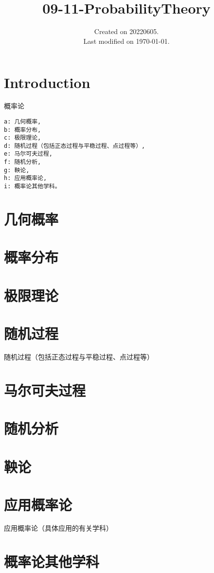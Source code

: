 \documentclass[UTF8]{../09-Mathematics}
\begin{document}
\title{09-11-ProbabilityTheory}
\date{Created on 20220605.\\   Last modified on \today.}
\maketitle
\tableofcontents


\chapter{Introduction}

概率论

\begin{lstlisting}
a: 几何概率, 
b: 概率分布, 
c: 极限理论, 
d: 随机过程（包括正态过程与平稳过程、点过程等）, 
e: 马尔可夫过程, 
f: 随机分析, 
g: 鞅论, 
h: 应用概率论, 
i: 概率论其他学科。

\end{lstlisting}

\chapter{几何概率}
\chapter{概率分布}
\chapter{极限理论}
\chapter{随机过程}
随机过程（包括正态过程与平稳过程、点过程等）
\chapter{马尔可夫过程}
\chapter{随机分析}
\chapter{鞅论}
\chapter{应用概率论}
应用概率论（具体应用的有关学科）
\chapter{概率论其他学科}
\end{document}
